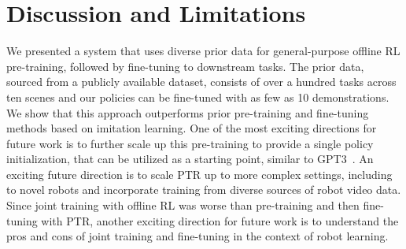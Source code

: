 \documentclass[../thesis.tex]{subfiles}
\begin{document}




\vspace{-0.2cm}
\section{Discussion and Limitations}
\label{sec:conclusion}
\vspace{-0.2cm}
We presented a system that uses diverse prior data for general-purpose offline RL pre-training, followed by fine-tuning to downstream tasks. The prior data, sourced from a publicly available dataset, consists of over a hundred tasks across ten scenes and our policies can be fine-tuned with as few as 10 demonstrations. We show that this approach outperforms prior pre-training and fine-tuning methods based on imitation learning. One of the most exciting directions for future work is to further scale up this pre-training to provide a single policy initialization, that can be utilized as a starting point, similar to GPT3~\citep{brown2020language}. 
An exciting future direction is to scale PTR up to more complex settings, including to novel robots and incorporate training from diverse sources of robot video data. {Since joint training with offline RL was worse than pre-training and then fine-tuning with PTR, another exciting direction for future work is to understand the pros and cons of joint training and fine-tuning in the context of robot learning.}
\end{document}
